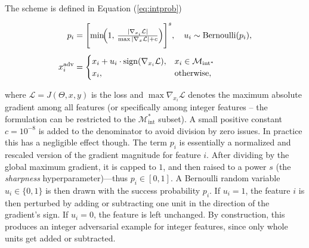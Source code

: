 The scheme is defined in Equation (\ref{eq:intprob})

\begin{equation}
\begin{aligned}
p_i &= \Biggl[\min\!\Bigl(1,\,
          \tfrac{|\nabla_{x_i}\mathcal{L}|}{\max|\nabla_{x}\mathcal{L}|+c}\Bigr)\Biggr]^{s}, \quad
u_i \sim \operatorname{Bernoulli}(p_i), \\[4pt]
x_i^{\text{adv}} &= 
    \begin{cases} 
    x_i + u_i\cdot \operatorname{sign}(\nabla_{x_i} \mathcal{L}), & x_i\in\mathcal{M}_{\text{int}^*} \\
    x_i, & \text{otherwise},
    \end{cases}
\end{aligned}
\label{eq:intprob}
\end{equation}

where $\mathcal{L}=J(\Theta,x,y)$ is the loss and $\max{\nabla_{x_i} \mathcal{L}}$ denotes the maximum absolute gradient among all features (or specifically among integer features – the formulation can be restricted to the $\mathcal{M}_{\text{int}}^*$ subset). A small positive constant $c=10^{-8}$ is added to the denominator to avoid division by zero issues. In practice this has a negligible effect though. The term $p_i$ is essentially a normalized and rescaled version of the gradient magnitude for feature $i$. After dividing by the global maximum gradient, it is capped to $1$, and then raised to a power $s$ (the \textit{sharpness} hyperparameter)—thus $p_i \in [0,1]$. A Bernoulli random variable $u_i\in\{0,1\}$ is then drawn with the success probability $p_i$. If $u_i=1$, the feature $i$ is then perturbed by adding or subtracting one unit in the direction of the gradient's sign. If $u_i=0$, the feature is left unchanged. By construction, this produces an integer adversarial example for integer features, since only whole units get added or subtracted.

